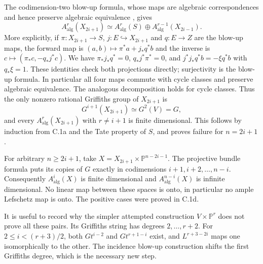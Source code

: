 The codimension-two blow-up formula, whose maps are algebraic
correspondences and hence preserve algebraic equivalence
\citep[Theorem 2.8(3)]{cyJiang2023}, gives
\begin{equation}\label{eq:iterated-griffiths-shift}
 A^r_{\mathrm{alg}}(X_{2i+1})
 \simeq A^r_{\mathrm{alg}}(S)
           \oplus A^{r-1}_{\mathrm{alg}}(X_{2i-1}).
\end{equation}
More explicitly, if $\pi:X_{2i+1}\to S$, $j:E\hookrightarrow
X_{2i+1}$ and $q:E\to Z$ are the blow-up maps, the forward map is
$(a,b)\mapsto\pi^*a+j_*q^*b$ and the inverse is
$c\mapsto(\pi_*c,-q_*j^*c)$. We have
$\pi_*j_*q^*=0$, $q_*j^*\pi^*=0$, and
$j^*j_*q^*b=-\xi q^*b$ with $q_*\xi=1$.
These identities check both projections directly; surjectivity is
the blow-up formula. In particular all four maps commute with
cycle classes and preserve algebraic equivalence.
The analogous decomposition holds for cycle classes. Thus the only
nonzero rational Griffiths group of $X_{2i+1}$ is
\[
 G^{i+1}(X_{2i+1})\simeq G^2(V)=G,
\]
and every $A^r_{\mathrm{alg}}(X_{2i+1})$ with $r\ne i+1$ is finite
dimensional. This follows by induction from C.1a and the Tate property
of $S$, and proves failure for $n=2i+1$.

For arbitrary $n\ge2i+1$, take
$X=X_{2i+1}\times\mathbb P^{n-2i-1}$. The projective bundle formula
puts its copies of $G$ exactly in codimensions
$i+1,i+2,\ldots,n-i$. Consequently $A^i_{\mathrm{alg}}(X)$ is finite
dimensional and $A^{n-i}_{\mathrm{alg}}(X)$ is infinite dimensional.
No linear map between these spaces is onto, in particular no ample
Lefschetz map is onto. The positive cases were proved in C.1d.

It is useful to record why the simpler attempted construction
$V\times\mathbb P^r$ does not prove all these pairs. Its Griffiths
string has degrees $2,\ldots,r+2$. For $2\le i<(r+3)/2$, both
$Gt^{i-2}$ and $Gt^{r+1-i}$ exist, and $L^{r+3-2i}$ maps one
isomorphically to the other. The incidence blow-up construction
shifts the first Griffiths degree, which is the necessary new step.






